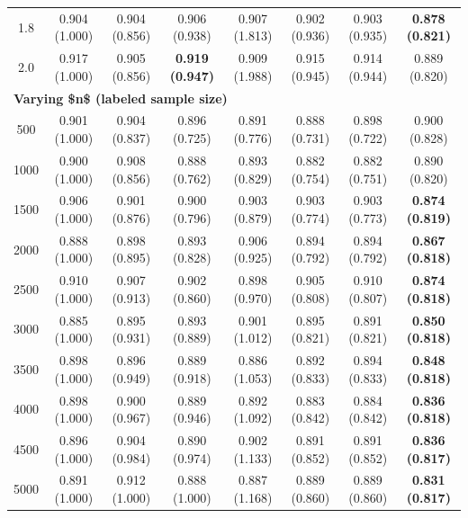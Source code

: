 \begin{table}[!h]
{\begin{tabular}[t]{|c|ccccccc|}
\hspace{1em}1.8 & 0.904 (1.000) & 0.904 (0.856) & 0.906 (0.938) & 0.907 (1.813) & 0.902 (0.936) & 0.903 (0.935) & \textbf{0.878 (0.821)}\\
\hspace{1em}2.0 & 0.917 (1.000) & 0.905 (0.856) & \textbf{0.919 (0.947)} & 0.909 (1.988) & 0.915 (0.945) & 0.914 (0.944) & 0.889 (0.820)\\
\hline
\multicolumn{8}{|l|}{\textbf{Varying \$n\$ (labeled sample size)}}\\
\hspace{1em}500 & 0.901 (1.000) & 0.904 (0.837) & 0.896 (0.725) & 0.891 (0.776) & 0.888 (0.731) & 0.898 (0.722) & 0.900 (0.828)\\
\hspace{1em}1000 & 0.900 (1.000) & 0.908 (0.856) & 0.888 (0.762) & 0.893 (0.829) & 0.882 (0.754) & 0.882 (0.751) & 0.890 (0.820)\\
\hspace{1em}1500 & 0.906 (1.000) & 0.901 (0.876) & 0.900 (0.796) & 0.903 (0.879) & 0.903 (0.774) & 0.903 (0.773) & \textbf{0.874 (0.819)}\\
\hspace{1em}2000 & 0.888 (1.000) & 0.898 (0.895) & 0.893 (0.828) & 0.906 (0.925) & 0.894 (0.792) & 0.894 (0.792) & \textbf{0.867 (0.818)}\\
\hspace{1em}2500 & 0.910 (1.000) & 0.907 (0.913) & 0.902 (0.860) & 0.898 (0.970) & 0.905 (0.808) & 0.910 (0.807) & \textbf{0.874 (0.818)}\\
\hspace{1em}3000 & 0.885 (1.000) & 0.895 (0.931) & 0.893 (0.889) & 0.901 (1.012) & 0.895 (0.821) & 0.891 (0.821) & \textbf{0.850 (0.818)}\\
\hspace{1em}3500 & 0.898 (1.000) & 0.896 (0.949) & 0.889 (0.918) & 0.886 (1.053) & 0.892 (0.833) & 0.894 (0.833) & \textbf{0.848 (0.818)}\\
\hspace{1em}4000 & 0.898 (1.000) & 0.900 (0.967) & 0.889 (0.946) & 0.892 (1.092) & 0.883 (0.842) & 0.884 (0.842) & \textbf{0.836 (0.818)}\\
\hspace{1em}4500 & 0.896 (1.000) & 0.904 (0.984) & 0.890 (0.974) & 0.902 (1.133) & 0.891 (0.852) & 0.891 (0.852) & \textbf{0.836 (0.817)}\\
\hspace{1em}5000 & 0.891 (1.000) & 0.912 (1.000) & 0.888 (1.000) & 0.887 (1.168) & 0.889 (0.860) & 0.889 (0.860) & \textbf{0.831 (0.817)}\\

\end{tabular}}
\end{table}

